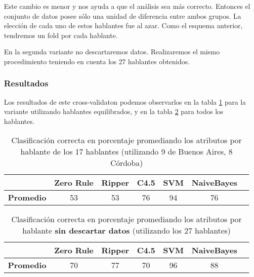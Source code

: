 Este cambio es menor y nos ayuda a que el análisis sea más correcto. Entonces el conjunto de datos posee sólo una unidad de diferencia entre ambos grupos. La elección de cada uno de estos hablantes fue al azar. Como el esquema anterior, tendremos un fold por cada hablante. 

En la segunda variante no descartaremos datos. Realizaremos el mismo procedimiento teniendo en cuenta los 27 hablantes obtenidos.

\subsubsection{Resultados}

Los resultados de este cross-validaton podemos observarlos en la tabla \ref{HPTDT_clas_xval_porHab} para la variante utilizando hablantes equilibrados, y en la tabla \ref{HPTDT_clas_xval_porHab_sindescartar} para todos los hablantes.

{\small 	
	\begin{table}[H]
		\centering
		\begin{tabular}{|l|c|c|c|c|c|c|}
			\hline
			\textbf{}  & \textbf{Zero Rule} & \textbf{Ripper} & \textbf{C4.5} & \textbf{SVM} & \textbf{NaiveBayes} \\ \hline
			\textbf{Promedio} & 53  & 53 & 76 & 94 & 76 \\ \hline
		\end{tabular}
		\caption{Clasificación correcta en porcentaje promediando los atributos por hablante de los 17 hablantes (utilizando 9 de Buenos Aires, 8 Córdoba)}
		\label{HPTDT_clas_xval_porHab}
	\end{table}
}

{\small 	
	\begin{table}[H]
		\centering
		\begin{tabular}{|l|c|c|c|c|c|c|}
			\hline
			\textbf{}  & \textbf{Zero Rule} & \textbf{Ripper} & \textbf{C4.5} & \textbf{SVM} & \textbf{NaiveBayes} \\ \hline
			\textbf{Promedio} & 70  & 77 & 70 & 96 & 88 \\ \hline
		\end{tabular}
		\caption{Clasificación correcta en porcentaje promediando los atributos por hablante \textbf{sin descartar datos} (utilizando los 27 hablantes)}
		\label{HPTDT_clas_xval_porHab_sindescartar}
	\end{table}
}


